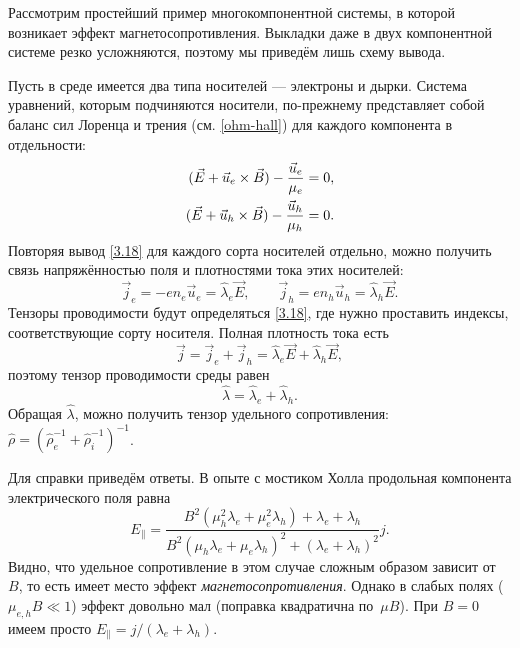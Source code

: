 \begin{lab:example}
Рассмотрим простейший пример многокомпонентной системы, в которой возникает
эффект магнетосопротивления. Выкладки даже в двух компонентной
системе резко усложняются, поэтому мы приведём лишь схему вывода.

Пусть в среде имеется два типа носителей --- электроны и дырки. Система
уравнений, которым подчиняются носители, по-прежнему представляет собой баланс
сил Лоренца и трения (см. \eqref{ohm-hall}) для каждого компонента в
отдельности:
\begin{equation}
    \eqmark{two-component}
    \begin{aligned}
(\vec{E}+\vec{u}_e\times \vec{B}) - \frac{\vec{u}_e}{\mu_e} &=0,\\
(\vec{E}+\vec{u}_h\times \vec{B}) - \frac{\vec{u}_h}{\mu_h} &=0.
\end{aligned}
\end{equation}
Повторяя вывод \eqref{3.18} для каждого сорта носителей отдельно, можно
получить связь напряжённостью поля и плотностями тока этих носителей:
\begin{equation}
    \vec{j}_e = -en_e \vec{u}_e = \hat{\lambda}_e \vec{E},\qquad
    \vec{j}_h = en_h \vec{u}_h = \hat{\lambda}_h \vec{E}.
\end{equation}
Тензоры проводимости будут определяться \eqref{3.18}, где нужно проставить
индексы, соответствующие сорту носителя.
Полная плотность тока есть
\[
\vec{j} = \vec{j}_e + \vec{j}_h = \hat{\lambda}_e \vec{E} +
\hat{\lambda}_h \vec{E},
\]
поэтому тензор проводимости среды равен
\[
\hat{\lambda} = \hat{\lambda}_e + \hat{\lambda}_h.
\]
Обращая $\hat{\lambda}$, можно получить тензор удельного сопротивления:
$\hat{\rho}=
\left(\hat{\rho}_e^{-1}+\hat{\rho}_i^{-1}\right)^{-1}$.

Для справки приведём ответы.
В опыте с мостиком Холла продольная компонента электрического поля равна
\[
E_{\parallel} = \frac{B^2 (\mu_h^2 \lambda_e + \mu_e^2 \lambda_h) + \lambda_e+
    \lambda_h}%
{ B^2 (\mu_h \lambda_e + \mu_e \lambda_h)^2 + (\lambda_e+\lambda_h)^2}
j.
\]
Видно, что удельное сопротивление в этом случае сложным образом
зависит от~$B$, то есть имеет место эффект \emph{магнетосопротивления}.
Однако в слабых полях ($\mu_{e,h}B \ll 1$) эффект довольно мал (поправка
квадратична по~$\mu B$). При $B=0$ имеем просто
$E_{\parallel} = j/(\lambda_e+\lambda_h)$.


\end{lab:example}
